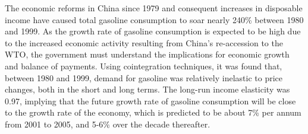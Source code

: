  The economic reforms in China since 1979 and consequent increases in disposable income have caused total gasoline consumption to soar nearly 240\% between 1980 and 1999. As the growth rate of gasoline consumption is expected to be high due to the increased economic activity resulting from China's re-accession to the WTO, the government must understand the implications for economic growth and balance of payments. Using cointegration techniques, it was found that, between 1980 and 1999, demand for gasoline was relatively inelastic to price changes, both in the short and long terms. The long-run income elasticity was 0.97, implying that the future growth rate of gasoline consumption will be close to the growth rate of the economy, which is predicted to be about 7\% per annum from 2001 to 2005, and 5-6\% over the decade thereafter. 